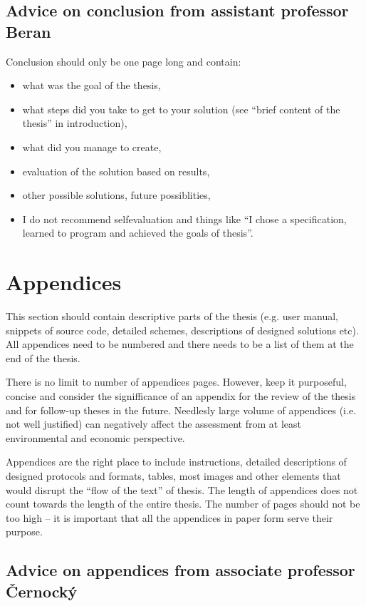 {{\subsection*{Advice on conclusion from assistant professor Beran}
Conclusion should only be one page long and contain:
    \begin{itemize}
      \item{what was the goal of the thesis,}
      \item{what steps did you take to get to your solution (see ``brief content of the thesis'' in introduction),}
      \item{what did you manage to create,}
      \item{evaluation of the solution based on results,}
      \item{other possible solutions, future possiblities,}
      \item{I do not recommend selfevaluation and things like ``I chose a specification, learned to program and achieved the goals of thesis''.}
    \end{itemize}

\section{Appendices}

This section should contain descriptive parts of the thesis (e.g. user manual, snippets of source code, detailed schemes, descriptions of designed solutions etc). All appendices need to be numbered and there needs to be a list of them at the end of the thesis. \cite{fitWeb}

There is no limit to number of appendices pages. However, keep it purposeful, concise and consider the signifficance of an appendix for the review of the thesis and for follow-up theses in the future. Needlesly large volume of appendices (i.e. not well justified) can negatively affect the assessment from at least environmental and economic perspective. \cite{fitWeb}

Appendices are the right place to include instructions, detailed descriptions of designed protocols and formats, tables, most images and other elements that would disrupt the ``flow of the text'' of thesis. The length of appendices does not count towards the length of the entire thesis. The number of pages should not be too high -- it is important that all the appendices in paper form serve their purpose.


\subsection*{Advice on appendices from associate professor Černocký}

}}
